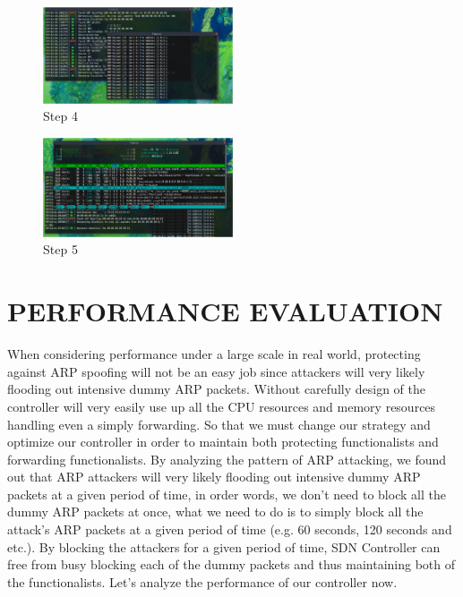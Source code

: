 \documentclass[conference]{IEEEtran}
\begin{document}
\begin{figure}[h!]
\includegraphics[width=0.5\textwidth]{out4.png}
\caption{Step 4}
\end{figure}

\begin{figure}[h!]
\includegraphics[width=0.5\textwidth]{out5.png}
\caption{Step 5}
\end{figure}


\section{PERFORMANCE EVALUATION}
When considering performance under a large scale in real world, protecting against ARP spoofing will not be an easy job since attackers will very likely flooding out intensive dummy ARP packets. Without carefully design of the controller will very easily use up all the CPU resources and memory resources handling even a simply forwarding. So that we must change our strategy and optimize our controller in order to maintain both protecting functionalists and forwarding functionalists. By analyzing the pattern of ARP attacking, we found out that ARP attackers will very likely flooding out intensive dummy ARP packets at a given period of time, in order words, we don't need to block all the dummy ARP packets at once, what we need to do is to simply block all the attack's ARP packets at a given period of time (e.g. 60 seconds, 120 seconds and etc.). By blocking the attackers for a given period of time, SDN Controller can free from busy blocking each of the dummy packets and thus maintaining both of the functionalists. Let's analyze the performance of our controller now.\\
\end{document}
